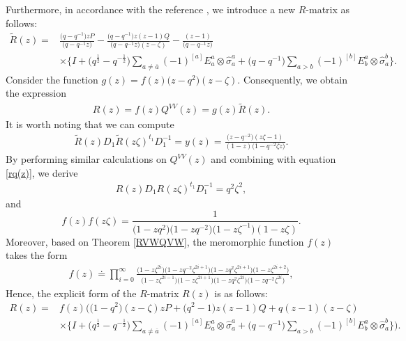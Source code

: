 \documentclass[10pt,a4paper]{amsart}
\numberwithin{equation}{section}
\begin{document}
Furthermore, in accordance with the reference \cite{MKMJ}, we introduce a new $R$-matrix as follows:
\begin{align}\label{R1}
 \widetilde{R}(z)={}&\frac{\bigl(q-q^{-1}\bigr)zP}{\bigl(q-q^{-1}z\bigr)}-\frac{\bigl(q-q^{-1}\bigr)z(z-1)Q}{\bigl(q-q^{-1}z\bigr)(z-\zeta)}-\frac{(z-1)}{\bigl(q-q^{-1}z\bigr)}
\nonumber\\
 &\times\biggl\{I+\bigl(q^{\frac{1}{2}}-q^{-\frac{1}{2}}\bigr)\sum\limits_{a\neq \overline{a}}(-1)^{[a]}E^a_a\otimes\hat{\sigma}^a_a+\bigl(q-q^{-1}\bigr)\sum\limits_{a> b}(-1)^{[b]}E^a_b\otimes \hat{\sigma}^b_a\biggr\}.
\end{align}
Consider the function $g(z)=f(z)\bigl(z-q^2\bigr)(z-\zeta)$. Consequently, we obtain the expression
\begin{gather}\label{rq(z)}
 R(z)=f(z)Q^{VV}(z)=g(z)\widetilde{R}(z).
\end{gather}
It is worth noting that we can compute
\begin{gather}
\label{d7}
 \widetilde{R}(z)D_1\widetilde{R}(z\zeta)^{t_1}D_1^{-1}=y(z)=\frac{\bigl(z-q^{-2}\bigr)(z\zeta-1)}{(1-z)\bigl(1-q^{-2}\zeta z\bigr)}.
\end{gather}
By performing similar calculations on $Q^{VV}(z)$ and combining with equation \eqref{rq(z)}, we derive
\begin{gather}\label{d6}
R(z)D_1R(z\zeta)^{t_1}D_1^{-1}=q^2\zeta^2,
\end{gather}
and
\[
 f(z)f(z\zeta)=\frac{1}{\bigl(1-zq^2\bigr)\bigl(1-zq^{-2}\bigr)\bigl(1-z\zeta^{-1}\bigr)(1-z\zeta)}.
\]
Moreover, based on Theorem \ref{RVWQVW}, the meromorphic function $f(z)$ takes the form
\begin{gather*}
 f(z)\doteq \prod\limits_{i=0}^{\infty}\frac{\bigl(1-z\zeta^{2i}\bigr)\bigl(1-zq^{-2}\zeta^{2i+1}\bigr)\bigl(1-zq^{2}\zeta^{2i+1}\bigr)\bigl(1-z\zeta^{2i+2}\bigr)} {\bigl(1-z\zeta^{2i-1}\bigr)\bigl(1-z\zeta^{2i+1}\bigr)\bigl(1-zq^{2}\zeta^{2i}\bigr)\bigl(1-zq^{-2}\zeta^{2i}\bigr)},
\end{gather*}
Hence, the explicit form of the $R$-matrix $R(z)$ is as follows:
\begin{align*}%
 R(z)={}&f(z)\bigl(\bigl(1-q^{2}\bigr)(z-\zeta)zP+\bigl(q^2-1\bigr)z(z-1)Q+q(z-1)(z-\zeta)\\
 &\times\biggl\{I+
\bigl(q^{\frac{1}{2}}-q^{-\frac{1}{2}}\bigr)\sum\limits_{a\neq \overline{a}}(-1)^{[a]}E^a_a\otimes\hat{\sigma}^a_a+\bigl(q-q^{-1}\bigr)\sum\limits_{a> b}(-1)^{[b]}E^a_b\otimes \hat{\sigma}^b_a\biggr\}\biggr).
\end{align*}
\end{document}
